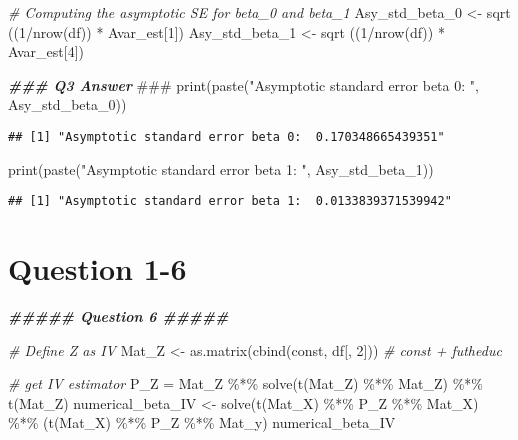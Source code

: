 \documentclass[
]{article}
\newenvironment{Shaded}{\begin{snugshade}}{\end{snugshade}}
\newcommand{\AlertTok}[1]{\textcolor[rgb]{0.94,0.16,0.16}{#1}}
\newcommand{\CommentTok}[1]{\textcolor[rgb]{0.56,0.35,0.01}{\textit{#1}}}
\newcommand{\DecValTok}[1]{\textcolor[rgb]{0.00,0.00,0.81}{#1}}
\newcommand{\DocumentationTok}[1]{\textcolor[rgb]{0.56,0.35,0.01}{\textbf{\textit{#1}}}}
\newcommand{\FunctionTok}[1]{\textcolor[rgb]{0.00,0.00,0.00}{#1}}
\newcommand{\NormalTok}[1]{#1}
\newcommand{\OtherTok}[1]{\textcolor[rgb]{0.56,0.35,0.01}{#1}}
\newcommand{\SpecialCharTok}[1]{\textcolor[rgb]{0.00,0.00,0.00}{#1}}
\newcommand{\StringTok}[1]{\textcolor[rgb]{0.31,0.60,0.02}{#1}}
\begin{document}
\begin{Shaded}
\begin{Highlighting}[]
\CommentTok{\# Computing the asymptotic SE for beta\_0 and beta\_1}
\NormalTok{Asy\_std\_beta\_0 }\OtherTok{\textless{}{-}} \FunctionTok{sqrt}\NormalTok{ ((}\DecValTok{1}\SpecialCharTok{/}\FunctionTok{nrow}\NormalTok{(df)) }\SpecialCharTok{*}\NormalTok{ Avar\_est[}\DecValTok{1}\NormalTok{])}
\NormalTok{Asy\_std\_beta\_1 }\OtherTok{\textless{}{-}} \FunctionTok{sqrt}\NormalTok{ ((}\DecValTok{1}\SpecialCharTok{/}\FunctionTok{nrow}\NormalTok{(df)) }\SpecialCharTok{*}\NormalTok{ Avar\_est[}\DecValTok{4}\NormalTok{])}

\DocumentationTok{\#\#\# Q3 Answer }\AlertTok{\#\#\#}
\FunctionTok{print}\NormalTok{(}\FunctionTok{paste}\NormalTok{(}\StringTok{"Asymptotic standard error beta 0: "}\NormalTok{, Asy\_std\_beta\_0))}
\end{Highlighting}
\end{Shaded}

\begin{verbatim}
## [1] "Asymptotic standard error beta 0:  0.170348665439351"
\end{verbatim}

\begin{Shaded}
\begin{Highlighting}[]
\FunctionTok{print}\NormalTok{(}\FunctionTok{paste}\NormalTok{(}\StringTok{"Asymptotic standard error beta 1: "}\NormalTok{, Asy\_std\_beta\_1))}
\end{Highlighting}
\end{Shaded}

\begin{verbatim}
## [1] "Asymptotic standard error beta 1:  0.0133839371539942"
\end{verbatim}

\hypertarget{question-1-6}{%
\section{Question 1-6}\label{question-1-6}}

\begin{Shaded}
\begin{Highlighting}[]
\DocumentationTok{\#\#\#\#\# Question 6 \#\#\#\#\#}

\CommentTok{\# Define Z as IV}
\NormalTok{Mat\_Z }\OtherTok{\textless{}{-}} \FunctionTok{as.matrix}\NormalTok{(}\FunctionTok{cbind}\NormalTok{(const, df[, }\DecValTok{2}\NormalTok{])) }\CommentTok{\# const + futheduc}

\CommentTok{\# get IV estimator}
\NormalTok{P\_Z }\OtherTok{=}\NormalTok{ Mat\_Z }\SpecialCharTok{\%*\%} \FunctionTok{solve}\NormalTok{(}\FunctionTok{t}\NormalTok{(Mat\_Z) }\SpecialCharTok{\%*\%}\NormalTok{ Mat\_Z) }\SpecialCharTok{\%*\%} \FunctionTok{t}\NormalTok{(Mat\_Z)}
\NormalTok{numerical\_beta\_IV }\OtherTok{\textless{}{-}} \FunctionTok{solve}\NormalTok{(}\FunctionTok{t}\NormalTok{(Mat\_X) }\SpecialCharTok{\%*\%}\NormalTok{ P\_Z }\SpecialCharTok{\%*\%}\NormalTok{ Mat\_X) }\SpecialCharTok{\%*\%}\NormalTok{ (}\FunctionTok{t}\NormalTok{(Mat\_X) }\SpecialCharTok{\%*\%}\NormalTok{ P\_Z }\SpecialCharTok{\%*\%}\NormalTok{ Mat\_y)}
\NormalTok{numerical\_beta\_IV}
\end{Highlighting}
\end{Shaded}
\end{document}
